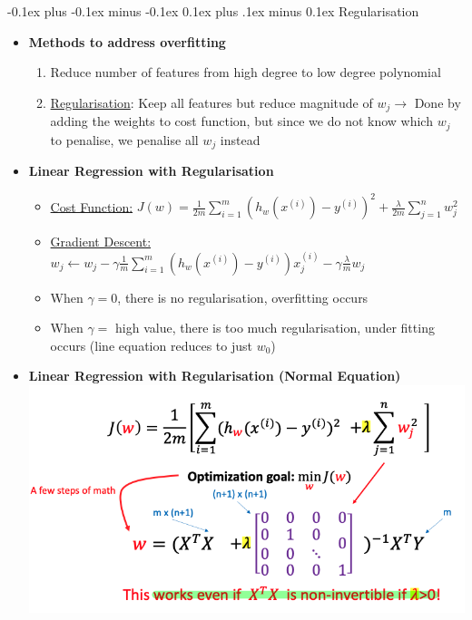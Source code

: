 \documentclass[landscape]{article}
\makeatletter
\renewcommand{\subsection}{\@startsection{subsection}{2}{0mm}%
  {-0.1ex plus -0.1ex minus -0.1ex}%
  {0.1ex plus .1ex minus 0.1ex}%
{\normalfont\scriptsize\bfseries}}
\makeatother
\begin{document}
\begin{multicols*}{5}
        \subsection{Regularisation}
        \begin{itemize}
          \item \textbf{Methods to address overfitting}
          \begin{enumerate}
            \item Reduce number of features from high degree to low degree polynomial
            \item \underline{Regularisation}: Keep all features but reduce magnitude of $w_j \rightarrow$ Done by adding the weights to cost function, but since we do not know which $w_j$ to penalise, we penalise all $w_j$ instead 
          \end{enumerate}
          \item \textbf{Linear Regression with Regularisation}
          \begin{itemize}
            \item \underline{Cost Function:} $J(w) = \frac{1}{2m} \sum_{i=1}^{m} \left( h_w(x^{(i)}) - y^{(i)} \right)^2 + \frac{\lambda}{2m} \sum_{j=1}^{n} w_j^2$
            \item \underline{Gradient Descent:} $w_j \leftarrow w_j - \gamma \frac{1}{m} \sum_{i=1}^{m} \left( h_w(x^{(i)}) - y^{(i)} \right) x_j^{(i)} - \gamma \frac{\lambda}{m} w_j$
            \item When $\gamma = 0$, there is no regularisation, overfitting occurs
            \item When $\gamma = $ high value, there is too much regularisation, under fitting occurs (line equation reduces to just $w_0$) 
          \end{itemize}
          \item \textbf{Linear Regression with Regularisation (Normal Equation)}
          \includegraphics[width=0.7\linewidth]{20_regularisation_normal_equation.png}
          \begin{itemize}

\end{itemize}
\end{itemize}
\end{multicols*}
\end{document}
